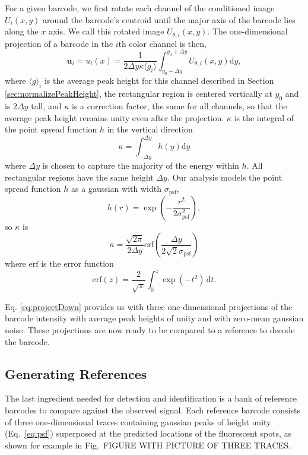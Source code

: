   For a given barcode, we first rotate each channel of the  conditioned image $U_i(x,y)$ around the barcode's centroid until the major axis of the barcode lies along the $x$ axis. We call this rotated image  $U_{\theta,i}(x,y)$. The one-dimensional projection of a barcode in the $i$th color channel is then, 
\begin{equation}\label{eq:projectDown}
	   \mathbf{u}_i=u_i(x)=\frac{1}{2 \Delta y \kappa\langle g_i \rangle}  \int_{y_0 - \Delta y}^{y_0+\Delta y} { {U_{\theta,i}(x,y) \mathrm{d}y} },
\end{equation}
where $\langle g \rangle_i$ is the average peak height for this channel described in Section \ref{sec:normalizePeakHeight}, the rectangular region is centered vertically at $y_0$ and is $2\Delta y$ tall, and $\kappa$ is a correction factor, the same for all channels, so that the average peak height remains unity even after the projection. $\kappa$ is the integral of the point spread function $h$ in the vertical direction
\begin{equation}
	\kappa=\int_{-\Delta y}^{\Delta y} h(y) \mathrm{d}y
\end{equation}
where $\Delta y$ is chosen to capture the majority of the energy within $h$. All rectangular regions have the same height $\Delta y$. Our analysis models the point spread function $h$ as a gaussian with width $\sigma_{\text{psf}}$,
\begin{equation}\label{eq:psf}
h(r)=\exp \left(  -\frac{r^2}{2\sigma_{\text{psf}}^2} \right),
\end{equation}
so $\kappa$ is
\begin{equation}
\kappa = \frac{\sqrt{2\pi}} {2 \Delta y} \text{erf} \left(\frac{\Delta y}{2\sqrt{2}\sigma_{\text{psf}}} \right)
\end{equation}
where $\text{erf}$ is the error function \citep{reif_fundamentals_1965}
\begin{equation}
\text{erf}(z) = \frac{2}{\sqrt{\pi}} \int_0^z \exp (-t^2) \, \mathrm{d}t.
\end{equation}

Eq. \ref{eq:projectDown} provides us with three one-dimensional projections of the barcode intensity with average peak heights of unity and with zero-mean gaussian noise. These projections are now ready to be compared to a reference to decode the barcode.

\subsection{Generating References}\label{sec:generateReferences}
The last ingredient needed for detection and identification is a bank of reference barcodes to compare against the observed signal. Each reference barcode consists of three one-dimensional traces containing  gaussian peaks of height unity (Eq.~\ref{eq:psf}) superposed at the predicted locations of the fluorescent spots, as shown for example in Fig.~FIGURE WITH PICTURE OF THREE TRACES. 


